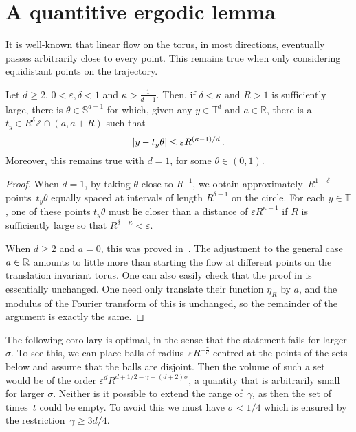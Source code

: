 \documentclass[biblatex]{pzorin-note}
\begin{document}
\section{A quantitive ergodic lemma}

It is well-known that linear flow on the torus, in most directions, eventually passes arbitrarily close to every point. This remains true
when only considering equidistant points on the trajectory.

\begin{lemma}\label{erg}
Let $d \geq 2$, $0<\varepsilon,\delta<1$ and $\kappa>\frac{1}{d+1}$. Then, if $\delta<\kappa$ and $R>1$ is sufficiently large,
there is $\theta \in \mathbb{S}^{d-1}$ for which, given any $y\in \mathbb{T}^{d}$ and $a\in\mathbb{R}$, there is a $t_y\in R^\delta\mathbb{Z}\cap(a,a+R)$ such that
\begin{equation*}
\lvert y-t_y\theta\rvert\le \varepsilon R^{(\kappa-1)/d} \, .
\end{equation*}
Moreover, this remains true with $d=1$, for some $\theta\in(0,1)$.
\end{lemma}

\begin{proof} When $d=1$, by taking $\theta$ close to $R^{-1}$, we obtain approximately~$R^{1-\delta}$ points~$t_y\theta$ equally spaced at intervals of length $R^{\delta-1}$ on the circle. For each $y\in \mathbb{T}$, one of these points $t_y\theta$ must lie closer than a distance of $\varepsilon R^{\kappa-1}$ if $R$ is sufficiently large so that $R^{\delta-\kappa}<\varepsilon$.

When $d\ge 2$ and $a=0$, this was proved in~\cite[Lemma~2]{LuR2}. The adjustment to the general case $a\in\mathbb{R}$ amounts to little more than starting the flow at different points on the translation invariant torus. One can also easily check that the proof in \cite{LuR2} is essentially unchanged. One need only translate their function $\eta_R$ by $a$, and the modulus of the Fourier transform of this is unchanged, so the remainder of the argument is exactly the same.
\end{proof}




The following corollary is optimal, in the sense that the statement fails for larger~$\sigma$.
To see this, we can place balls
of radius~$\varepsilon R^{-\frac{\gamma}{d}}$ centred at the points of the sets below and assume that the balls are disjoint.
Then the volume of such a set would be of the order $\varepsilon^dR^{d+1/2-\gamma-(d+2)\sigma}$, a quantity that
is arbitrarily small for larger $\sigma$.
Neither is it possible to extend the range of~$\gamma$, as then the set of times~$t$ could be empty. To avoid this we must
have $\sigma < 1/4$ which is ensured by the restriction~$\gamma \geq 3d/4$.
\end{document}
